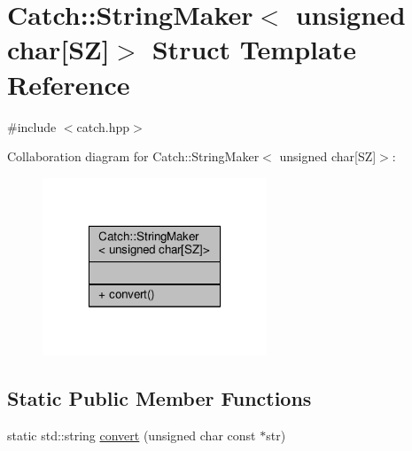 \hypertarget{struct_catch_1_1_string_maker_3_01unsigned_01char[_s_z]_4}{\section{Catch\-:\-:String\-Maker$<$ unsigned char\mbox{[}S\-Z\mbox{]}$>$ Struct Template Reference}
\label{struct_catch_1_1_string_maker_3_01unsigned_01char[_s_z]_4}
}


{\ttfamily \#include $<$catch.\-hpp$>$}



Collaboration diagram for Catch\-:\-:String\-Maker$<$ unsigned char\mbox{[}S\-Z\mbox{]}$>$\-:
\nopagebreak
\begin{figure}[H]
\begin{center}
\leavevmode
\includegraphics[width=190pt]{struct_catch_1_1_string_maker_3_01unsigned_01char[_s_z]_4__coll__graph}
\end{center}
\end{figure}
\subsection*{Static Public Member Functions}
\begin{DoxyCompactItemize}
\item 
static std\-::string \hyperlink{struct_catch_1_1_string_maker_3_01unsigned_01char[_s_z]_4_a590d64c72b0cc75c113f1eea95d52b66}{convert} (unsigned char const $\ast$str)
\end{DoxyCompactItemize}


